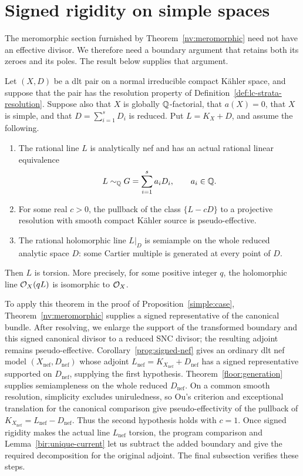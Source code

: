 \section{Signed rigidity on simple spaces}
\label{sec:signed}

The meromorphic section furnished by Theorem~\ref{nv:meromorphic} need
not have an effective divisor.  We therefore need a boundary argument
that retains both its zeroes and its poles.  The result below supplies
that argument.

\begin{theorem}\label{signed:torsion}
Let \((X,D)\) be a dlt pair on a normal irreducible compact Kähler
space, and suppose that the pair has the resolution property of
Definition~\ref{def:lc-strata-resolution}.  Suppose also that \(X\) is
globally \(\mathbb Q\)-factorial, that \(a(X)=0\), that \(X\) is simple,
and that \(D=\sum_{i=1}^sD_i\) is reduced.  Put \(L=K_X+D\), and
assume the following.
\begin{enumerate}
\item The rational line \(L\) is analytically nef and has an actual
rational linear equivalence
\[
 L\sim_{\mathbb Q}G=\sum_{i=1}^s a_iD_i,\qquad a_i\in\mathbb Q.
\]
\item For some real \(c>0\), the pullback of the class
\(\{L-cD\}\) to a projective resolution with smooth compact
Kähler source is pseudo-effective.
\item The rational holomorphic line \(L|_D\) is semiample on the
whole reduced analytic space \(D\): some Cartier multiple is
generated at every point of \(D\).
\end{enumerate}
Then \(L\) is torsion.  More precisely, for some positive integer
\(q\), the holomorphic line \(\mathcal O_X(qL)\) is isomorphic to
\(\mathcal O_X\).
\end{theorem}

To apply this theorem in the proof of Proposition~\ref{simple:case},
Theorem~\ref{nv:meromorphic} supplies a signed representative of the
canonical bundle.  After resolving, we enlarge the support of the
transformed boundary and this signed canonical divisor to a reduced SNC
divisor; the resulting adjoint remains pseudo-effective.
Corollary~\ref{prog:signed-nef} gives an ordinary dlt nef model
\((X_{\mathrm{nef}},D_{\mathrm{nef}})\) whose adjoint
\(L_{\mathrm{nef}}=K_{X_{\mathrm{nef}}}+D_{\mathrm{nef}}\) has a
signed representative supported on \(D_{\mathrm{nef}}\), supplying
the first hypothesis.  Theorem~\ref{floor:generation} supplies
semiampleness on the whole reduced \(D_{\mathrm{nef}}\).  On a common
smooth resolution, simplicity excludes uniruledness, so Ou's criterion
\cite[Theorem~1.1]{Ou2025} and exceptional translation for the canonical
comparison give pseudo-effectivity of the pullback of
\(K_{X_{\mathrm{nef}}}=L_{\mathrm{nef}}-D_{\mathrm{nef}}\).  Thus the
second hypothesis holds with \(c=1\).  Once signed rigidity makes the
actual line \(L_{\mathrm{nef}}\) torsion, the program comparison and
Lemma~\ref{bir:unique-current} let us subtract the added boundary and give
the required decomposition for the original adjoint.  The final subsection
verifies these steps.

